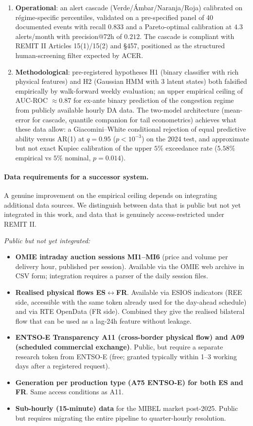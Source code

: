 \documentclass[11pt,a4paper]{article}
\begin{document}
\begin{enumerate}
\item \textbf{Operational}: an alert cascade
(Verde/Ámbar/Naranja/Roja) calibrated on régime-specific
percentiles, validated on a pre-specified panel of 40 documented
events with recall $0.833$ and a Pareto-optimal calibration at
$4.3$ alerts/month with precision@72h of $0.212$. The cascade is
compliant with REMIT II Articles 15(1)/15(2) and §457, positioned
as the structured human-screening filter expected by ACER.

\item \textbf{Methodological}: pre-registered hypotheses H1
(binary classifier with rich physical features) and H2 (Gaussian
HMM with 3 latent states) both falsified empirically by
walk-forward weekly evaluation; an upper empirical ceiling of
AUC-ROC $\approx 0.87$ for ex-ante binary prediction of the
congestion regime from publicly available hourly DA data. The
two-model architecture (mean-error for cascade, quantile companion
for tail econometrics) achieves what these data allow: a
Giacomini--White conditional rejection of equal predictive ability
versus AR(1) at $q = 0.95$ ($p < 10^{-3}$) on the 2024 test, and
approximate but not exact Kupiec calibration of the upper $5\%$
exceedance rate ($5.58\%$ empirical vs $5\%$ nominal,
$p = 0.014$).
\end{enumerate}

\paragraph{Data requirements for a successor system.}
A genuine improvement on the empirical ceiling depends on
integrating additional data sources. We distinguish between
data that is public but not yet integrated in this work, and data
that is genuinely access-restricted under REMIT II.

\textit{Public but not yet integrated:}
\begin{itemize}
\item \textbf{OMIE intraday auction sessions MI1--MI6} (price and
volume per delivery hour, published per session). Available via
the OMIE web archive in CSV form; integration requires a parser
of the daily session files.
\item \textbf{Realised physical flows ES$\leftrightarrow$FR}.
Available via ESIOS indicators (REE side, accessible with the same
token already used for the day-ahead schedule) and via RTE
OpenData (FR side). Combined they give the realised bilateral flow
that can be used as a lag-24h feature without leakage.
\item \textbf{ENTSO-E Transparency A11 (cross-border physical flow)
and A09 (scheduled commercial exchange)}. Public, but require a
separate research token from ENTSO-E (free; granted typically
within 1--3 working days after a registered request).
\item \textbf{Generation per production type (A75 ENTSO-E) for both
ES and FR}. Same access conditions as A11.
\item \textbf{Sub-hourly (15-minute) data} for the MIBEL market
post-2025. Public but requires migrating the entire pipeline to
quarter-hourly resolution.
\end{itemize}
\end{document}
